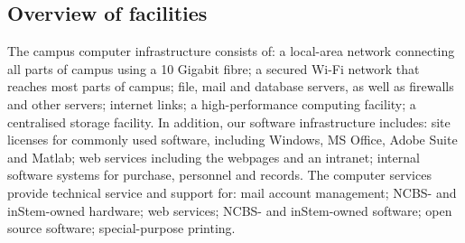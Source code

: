 \documentclass[a4paper]{extarticle}
\begin{document}
\subsection{Overview of facilities}
The campus computer infrastructure consists of: a local-area
network connecting all parts of campus using a 10 Gigabit fibre; a secured Wi-Fi network
that reaches most parts of campus; file, mail and database servers, as well as firewalls and
other servers; internet links; a high-performance computing facility; a centralised storage
facility. In addition, our software infrastructure includes: site licenses for commonly used
software, including Windows, MS Office, Adobe Suite and Matlab; web services including
the webpages and an intranet; internal software systems for purchase, personnel and records.
The computer services provide technical service and support for: mail account management;
NCBS- and inStem-owned hardware; web services; NCBS- and inStem-owned software;
open source software; special-purpose printing.
\end{document}
